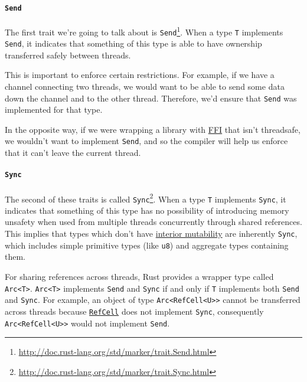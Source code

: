 \documentclass[a4paper,]{book}
\renewcommand{\href}[2]{#2\footnote{\url{#1}}}
\let\oldparagraph\paragraph
\renewcommand{\paragraph}[1]{\oldparagraph{#1}\mbox{}}
\begin{document}
\paragraph{\texorpdfstring{\texttt{Send}}{Send}}\label{send}

The first trait we're going to talk about is
\href{http://doc.rust-lang.org/std/marker/trait.Send.html}{\texttt{Send}}.
When a type \texttt{T} implements \texttt{Send}, it indicates that
something of this type is able to have ownership transferred safely
between threads.

This is important to enforce certain restrictions. For example, if we
have a channel connecting two threads, we would want to be able to send
some data down the channel and to the other thread. Therefore, we'd
ensure that \texttt{Send} was implemented for that type.

In the opposite way, if we were wrapping a library with
\protect\hyperlink{sec--ffi}{FFI} that isn't threadsafe, we wouldn't
want to implement \texttt{Send}, and so the compiler will help us
enforce that it can't leave the current thread.

\paragraph{\texorpdfstring{\texttt{Sync}}{Sync}}\label{sync}

The second of these traits is called
\href{http://doc.rust-lang.org/std/marker/trait.Sync.html}{\texttt{Sync}}.
When a type \texttt{T} implements \texttt{Sync}, it indicates that
something of this type has no possibility of introducing memory unsafety
when used from multiple threads concurrently through shared references.
This implies that types which don't have
\protect\hyperlink{sec--mutability}{interior mutability} are inherently
\texttt{Sync}, which includes simple primitive types (like \texttt{u8})
and aggregate types containing them.

For sharing references across threads, Rust provides a wrapper type
called \texttt{Arc\textless{}T\textgreater{}}.
\texttt{Arc\textless{}T\textgreater{}} implements \texttt{Send} and
\texttt{Sync} if and only if \texttt{T} implements both \texttt{Send}
and \texttt{Sync}. For example, an object of type
\texttt{Arc\textless{}RefCell\textless{}U\textgreater{}\textgreater{}}
cannot be transferred across threads because
\protect\hyperlink{refcellt}{\texttt{RefCell}} does not implement
\texttt{Sync}, consequently
\texttt{Arc\textless{}RefCell\textless{}U\textgreater{}\textgreater{}}
would not implement \texttt{Send}.
\end{document}
